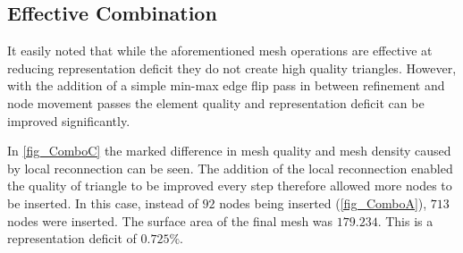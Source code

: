 \subsection{Effective Combination}
It easily noted that while the aforementioned mesh operations are
effective at reducing representation deficit they do not create high
quality triangles.  However, with the addition of a simple min-max edge
flip pass in between refinement and node movement passes the element
quality and representation deficit can be improved significantly.

\begin{figure}[h!]
  \begin{center}
  \label{fig_NodeSmoothing}
 
  \end{center}
\end{figure}

In \ref{fig_ComboC} the marked difference in mesh quality and mesh
density caused by local reconnection can be seen. The addition of the
local reconnection enabled the quality of triangle to be improved every
step therefore allowed more nodes to be inserted. In this case, instead
of $92$ nodes being inserted (\ref{fig_ComboA}), $713$ nodes were
inserted. The surface area of the final mesh was $179.234$. This is a
representation deficit of $0.725\%$.
